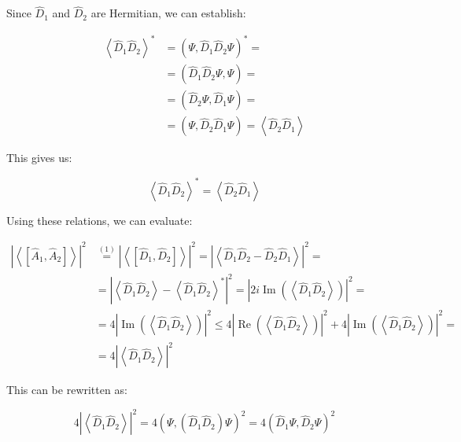 \documentclass[italian]{HKNdocument}
\begin{document}
Since $\hat{D}_1$ and $\hat{D}_2$ are Hermitian, we can establish:

\begin{align*}
\left\langle\hat{D}_{1} \hat{D}_{2}\right\rangle^{*} & =\left(\Psi, \hat{D}_{1} \hat{D}_{2} \Psi\right)^{*}= \\
& =\left(\hat{D}_{1} \hat{D}_{2} \Psi, \Psi\right)=  \tag{7.10}\\
& =\left(\hat{D}_{2} \Psi, \hat{D}_{1} \Psi\right)= \\
& =\left(\Psi, \hat{D}_{2} \hat{D}_{1} \Psi\right)=\left\langle\hat{D}_{2} \hat{D}_{1}\right\rangle
\end{align*}

This gives us:

\begin{equation*}
\left\langle\hat{D}_{1} \hat{D}_{2}\right\rangle^{*}=\left\langle\hat{D}_{2} \hat{D}_{1}\right\rangle \tag{7.11}
\end{equation*}

Using these relations, we can evaluate:

\begin{align*}
\left|\left\langle\left[\hat{A}_{1}, \hat{A}_{2}\right]\right\rangle\right|^{2} & \stackrel{(1)}{=}\left|\left\langle\left[\hat{D}_{1}, \hat{D}_{2}\right]\right\rangle\right|^{2}=\left|\left\langle\hat{D}_{1} \hat{D}_{2}-\hat{D}_{2} \hat{D}_{1}\right\rangle\right|^{2}= \\
& =\left|\left\langle\hat{D}_{1} \hat{D}_{2}\right\rangle-\left\langle\hat{D}_{1} \hat{D}_{2}\right\rangle^{*}\right|^{2}=\left|2 i \operatorname{Im}\left(\left\langle\hat{D}_{1} \hat{D}_{2}\right\rangle\right)\right|^{2}= \\
& =4\left|\operatorname{Im}\left(\left\langle\hat{D}_{1} \hat{D}_{2}\right\rangle\right)\right|^{2} \leq 4\left|\operatorname{Re}\left(\left\langle\hat{D}_{1} \hat{D}_{2}\right\rangle\right)\right|^{2}+4\left|\operatorname{Im}\left(\left\langle\hat{D}_{1} \hat{D}_{2}\right\rangle\right)\right|^{2}= \\
& =4\left|\left\langle\hat{D}_{1} \hat{D}_{2}\right\rangle\right|^{2} \tag{7.12}
\end{align*}

This can be rewritten as:

\begin{equation*}
4\left|\left\langle\hat{D}_{1} \hat{D}_{2}\right\rangle\right|^{2}=4\left(\Psi,\left(\hat{D}_{1} \hat{D}_{2}\right) \Psi\right)^{2}=4\left(\hat{D}_{1} \Psi, \hat{D}_{2} \Psi\right)^{2} \tag{7.13}
\end{equation*}
\end{document}
